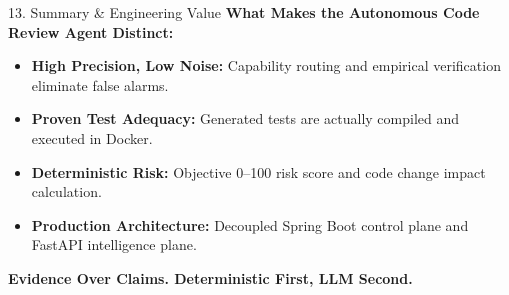 \documentclass[aspectratio=169,11pt]{beamer}
\begin{document}
\begin{frame}{13. Summary \& Engineering Value}
  \textbf{What Makes the Autonomous Code Review Agent Distinct:}
  \vspace{0.3cm}
  \begin{itemize}
    \item \textbf{High Precision, Low Noise:} Capability routing and empirical verification eliminate false alarms.
    \vspace{0.25cm}
    \item \textbf{Proven Test Adequacy:} Generated tests are actually compiled and executed in Docker.
    \vspace{0.25cm}
    \item \textbf{Deterministic Risk:} Objective 0--100 risk score and code change impact calculation.
    \vspace{0.25cm}
    \item \textbf{Production Architecture:} Decoupled Spring Boot control plane and FastAPI intelligence plane.
  \end{itemize}
  \vspace{0.5cm}
  \centering
  {\color{accentNavy}\textbf{Evidence Over Claims. Deterministic First, LLM Second.}}
\end{frame}
\end{document}
